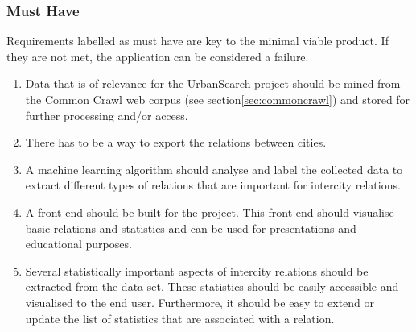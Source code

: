 \subsubsection{Must Have}
Requirements labelled as must have are key to the minimal viable product. If they are not met, the application can be considered a failure.

\begin{enumerate}
    \item Data that is of relevance for the UrbanSearch project should be mined from the Common Crawl web corpus (see section\ref{sec:commoncrawl}) and stored for further processing and/or access.
    \item There has to be a way to export the relations between cities.
    \item A machine learning algorithm should analyse and label the collected data to extract different types of relations that are important for intercity relations.
    \item A front-end should be built for the project. This front-end should visualise basic relations and statistics and can be used for presentations and educational purposes.
    \item Several statistically important aspects of intercity relations should be extracted from the data set. These statistics should be easily accessible and visualised to the end user. Furthermore, it should be easy to extend or update the list of statistics that are associated with a relation.
\end{enumerate}

